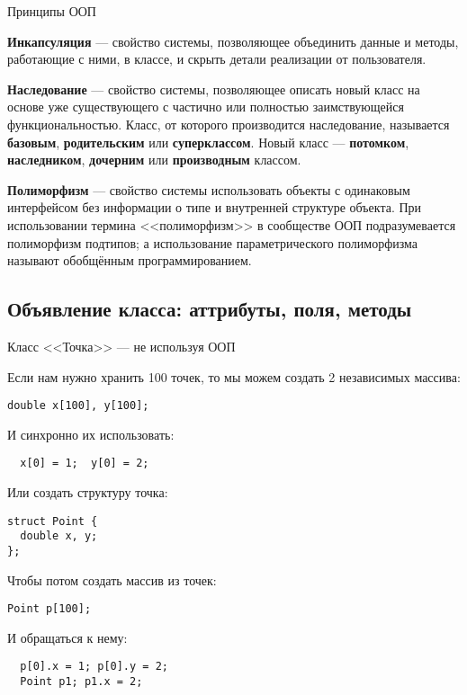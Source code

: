 \begin{frame}[t]{Принципы ООП}

\textbf{Инкапсуляция} --- свойство системы, позволяющее объединить данные и методы, 
работающие с ними, в классе, и скрыть детали реализации от пользователя.

\textbf{Наследование} --- свойство системы, позволяющее описать новый класс на основе 
уже существующего с частично или полностью заимствующейся функциональностью. 
Класс, от которого производится наследование, называется 
\textbf{базовым}, \textbf{родительским} или \textbf{суперклассом}. 
Новый класс --- \textbf{потомком}, \textbf{наследником}, \textbf{дочерним} или \textbf{производным} классом.

\textbf{Полиморфизм} --- свойство системы использовать объекты с одинаковым интерфейсом без информации о типе и внутренней структуре объекта.
При использовании термина <<полиморфизм>> в сообществе ООП подразумевается полиморфизм подтипов; 
а использование параметрического полиморфизма называют обобщённым программированием.

\end{frame}
                     
\subsection{Объявление класса: аттрибуты, поля, методы}
\begin{frame}[t,fragile]{Класс <<Точка>> --- не используя ООП}

Если нам нужно хранить 100 точек, то мы можем создать 2 независимых массива:
\begin{lstlisting}
double x[100], y[100];
\end{lstlisting}

И синхронно их использовать:
\begin{lstlisting}
  x[0] = 1;  y[0] = 2;
\end{lstlisting}

Или создать структуру точка:
\begin{lstlisting}
struct Point {
  double x, y;
};
\end{lstlisting}

Чтобы потом создать массив из точек:
\begin{lstlisting}
Point p[100];
\end{lstlisting}

И обращаться к нему:
\begin{lstlisting}
  p[0].x = 1; p[0].y = 2;
  Point p1; p1.x = 2;
\end{lstlisting}
\end{frame}


